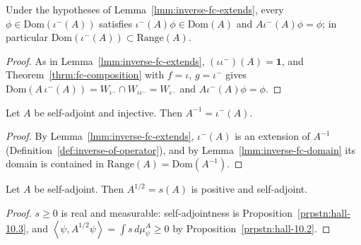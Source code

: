 \begin{lemma}
    \label{lmm:inverse-fc-domain}
    \leanok
    Under the hypotheses of Lemma~\ref{lmm:inverse-fc-extends}, every $\phi \in \text{Dom}(\iota^{-}(A))$ satisfies $\iota^-(A)\phi \in \text{Dom}(A)$ and $A\iota^{-}(A)\phi = \phi$; in particular $\text{Dom}(\iota^{-}(A)) \subset \text{Range}(A)$.
\end{lemma}
\begin{proof}
    \leanok
    As in Lemma~\ref{lmm:inverse-fc-extends}, $(\iota\iota^{-})(A) = \mathbf{1}$, and Theorem~\ref{thrm:fc-composition} with $f = \iota$, $g = \iota^{-}$ gives $\text{Dom}(A\,\iota^{-}(A)) = W_{\iota^-} \cap W_{\iota\iota^-} = W_{\iota^-}$ and $A\iota^{-}(A)\phi = \phi$.
\end{proof}

\begin{lemma}
    \label{lmm:inverse-functional-calculus}
    \leanok
    Let $A$ be self-adjoint and injective. Then $A^{-1} = \iota^{-}(A)$.
\end{lemma}
\begin{proof}
    \leanok
    By Lemma~\ref{lmm:inverse-fc-extends}, $\iota^{-}(A)$ is an extension of $A^{-1}$ (Definition~\ref{def:inverse-of-operator}), and by Lemma~\ref{lmm:inverse-fc-domain} its domain is contained in $\text{Range}(A) = \text{Dom}(A^{-1})$.
\end{proof}

\begin{lemma}
    \label{lmm:square-root-positive}
    \leanok
    Let $A$ be self-adjoint. Then $A^{1/2} = s(A)$ is positive and self-adjoint.
\end{lemma}
\begin{proof}
    \leanok
    $s \ge 0$ is real and measurable: self-adjointness is Proposition~\ref{prpstn:hall-10.3}, and $\left< \psi, A^{1/2}\psi \right> = \int s \, d\mu^A_\psi \ge 0$ by Proposition~\ref{prpstn:hall-10.2}.
\end{proof}

